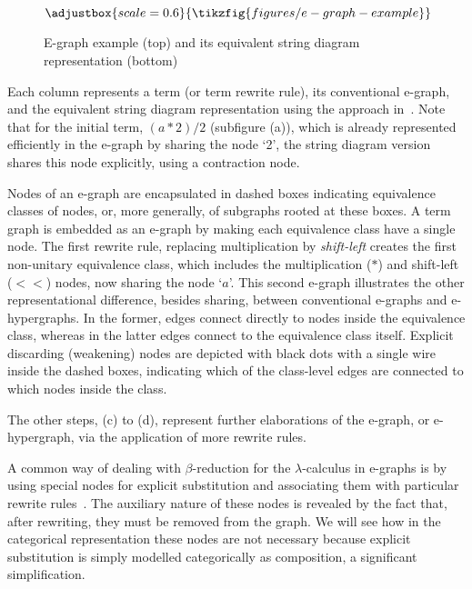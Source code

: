 \begin{figure*}[h!]
\[
\adjustbox{scale=0.6}{
\tikzfig{figures/e-graph-example}
}
\]
\caption{E-graph example (top) and its equivalent string diagram representation (bottom)~\cite{ghica2024equivalencehypergraphsegraphsmonoidal}}
\label{fig:e-graph-example}
\end{figure*}

Each column represents a term (or term rewrite rule), its conventional e-graph, and the equivalent string diagram representation using the approach in~\cite{ghica2024equivalencehypergraphsegraphsmonoidal}. 
Note that for the initial term, $(a*2)/2$ (subfigure (a)), which is already represented efficiently in the e-graph by sharing the node `2', the string diagram version shares this node explicitly, using a contraction node.

Nodes of an e-graph are encapsulated in dashed boxes indicating equivalence classes of nodes, or, more generally, of subgraphs rooted at these boxes.
A term graph is embedded as an e-graph by making each equivalence class have a single node.
The first rewrite rule, replacing multiplication by \emph{shift-left} creates the first non-unitary equivalence class, which includes the multiplication ($*$) and shift-left ($<\!\!<$) nodes,  now sharing the node `$a$'.
This second e-graph illustrates the other representational difference, besides sharing, between conventional e-graphs and e-hypergraphs.
In the former, edges connect directly to nodes inside the equivalence class, whereas in the latter edges connect to the equivalence class itself.
Explicit discarding (weakening) nodes are depicted with black dots with a single wire
inside the dashed boxes, indicating which of the class-level edges are connected to which nodes inside the class.

The other steps, (c) to (d), represent further elaborations of the e-graph, or e-hypergraph, via the application of more rewrite rules.

A common way of dealing with $\beta$-reduction for the $\lambda$-calculus in e-graphs is by using special nodes for explicit substitution and associating them with particular rewrite rules~\cite{EggPaper,koehler2022sketchguided}.
The auxiliary nature of these nodes is revealed by the fact that, after rewriting, they must be removed from the graph. 
We will see how in the categorical representation these nodes are not necessary because explicit substitution is simply modelled categorically as composition, a significant simplification.

